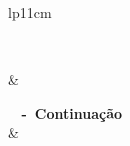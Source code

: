 \begin{longtable}{lp{11cm}}

\caption{\textbf{Histórico do Ensino de Empreendedorismo no Brasil}}\label{tabela_1} \\ \hline \hline


\hline {} & \\ \hline 

\endfirsthead


%

{{\bfseries \tabname \ \thetable{} -\ \textbf{Continuação}}}\\

\hline {} &   \\ \hline 

\endhead

\hline {} \\ \hline

\endfoot
\hline {} \\ \hline

\endfoot
\hline {} \\ \hline
\hline \hline

\endlastfoot



\end{longtable}
